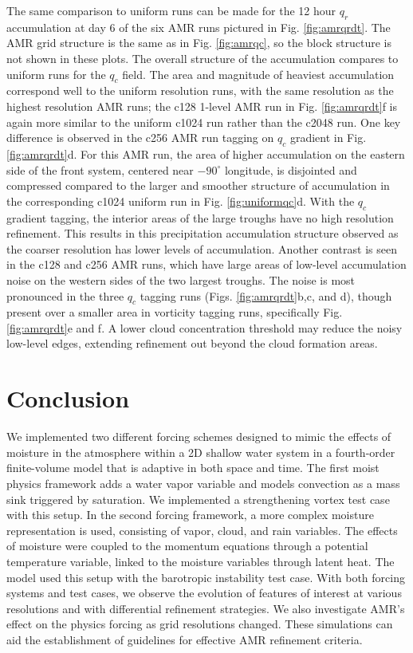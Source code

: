 The same comparison to uniform runs can be made for the 12 hour $q_r$ accumulation
at day 6 of the six AMR runs pictured in Fig. \ref{fig:amrqrdt}. The AMR grid structure is the same
as in Fig. \ref{fig:amrqc}, so the block structure is not shown in these plots. The overall structure
of the accumulation compares to uniform runs for the $q_c$ field.
The area and magnitude of heaviest accumulation correspond well to the uniform resolution runs,
with the same resolution as the highest resolution AMR runs; the c128 1-level AMR run
in Fig. \ref{fig:amrqrdt}f is again more similar to the uniform c1024 run rather than the c2048 run.
One key difference is observed in the 
c256 AMR run tagging on $q_c$ gradient in Fig. \ref{fig:amrqrdt}d. For this AMR run, the
 area of higher accumulation on the eastern side of the front
system, centered near $-90^\circ$ longitude,
is disjointed and compressed compared to the larger and smoother structure of accumulation in
the corresponding c1024 uniform run in Fig. \ref{fig:uniformqc}d.
With the $q_c$ gradient tagging, the interior areas of the large troughs have no high resolution refinement. 
This results in this precipitation accumulation structure observed 
as the coarser resolution has lower levels of accumulation.
Another contrast is seen in the c128 and c256 AMR runs, which have large areas of low-level accumulation noise 
on the western sides of the two largest troughs. The noise is most pronounced in the three
$q_c$ tagging runs (Figs. \ref{fig:amrqrdt}b,c, and d), though present over a smaller area in vorticity tagging runs, 
specifically Fig. \ref{fig:amrqrdt}e and f. A lower cloud concentration threshold may reduce the noisy low-level edges, extending refinement out beyond the cloud formation areas.


\section{Conclusion}
\label{sec:conclusion2}
We implemented two different forcing schemes designed to 
mimic the effects of moisture in the atmosphere within a 2D 
shallow water system in a fourth-order finite-volume model
that is adaptive in both space and time. The first moist physics
framework adds a water vapor variable and models convection
as a mass sink triggered by saturation. We implemented a
strengthening vortex test case with this setup.  In the second
forcing framework, a more complex moisture representation
is used, consisting of vapor, cloud, and rain variables.
The effects of moisture were coupled to the momentum equations
through a potential temperature variable, linked to
the moisture variables through latent heat. The model used
this setup with the barotropic instability test case. 
With both forcing systems and test cases, we observe
the evolution of features of interest at various resolutions and 
with differential refinement strategies. 
We also investigate AMR's effect on the physics 
forcing as grid resolutions changed.
These simulations can aid the
establishment of guidelines for effective AMR refinement criteria.

